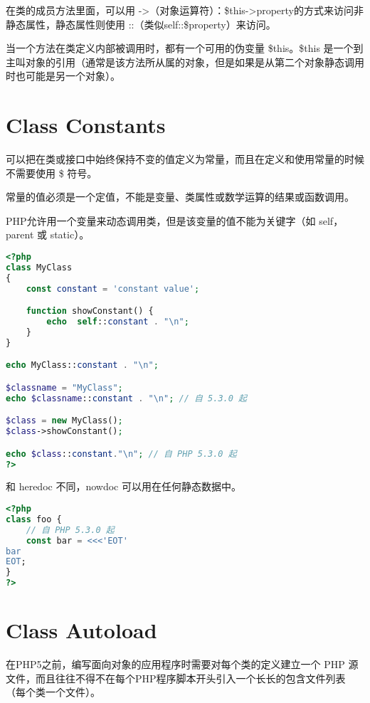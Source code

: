 在类的成员方法里面，可以用 ->（对象运算符）：\$this->property的方式来访问非静态属性，静态属性则使用 ::（类似self::\$property）来访问。



当一个方法在类定义内部被调用时，都有一个可用的伪变量 \$this。\$this 是一个到主叫对象的引用（通常是该方法所从属的对象，但是如果是从第二个对象静态调用时也可能是另一个对象）。





\chapter{Class Constants}


可以把在类或接口中始终保持不变的值定义为常量，而且在定义和使用常量的时候不需要使用 \$ 符号。

常量的值必须是一个定值，不能是变量、类属性或数学运算的结果或函数调用。

PHP允许用一个变量来动态调用类，但是该变量的值不能为关键字（如 self，parent 或 static）。





\begin{lstlisting}[language=PHP]
<?php
class MyClass
{
    const constant = 'constant value';

    function showConstant() {
        echo  self::constant . "\n";
    }
}

echo MyClass::constant . "\n";

$classname = "MyClass";
echo $classname::constant . "\n"; // 自 5.3.0 起

$class = new MyClass();
$class->showConstant();

echo $class::constant."\n"; // 自 PHP 5.3.0 起
?>
\end{lstlisting}

和 heredoc 不同，nowdoc 可以用在任何静态数据中。





\begin{lstlisting}[language=PHP]
<?php
class foo {
    // 自 PHP 5.3.0 起
    const bar = <<<'EOT'
bar
EOT;
}
?>
\end{lstlisting}


\chapter{Class Autoload}

在PHP5之前，编写面向对象的应用程序时需要对每个类的定义建立一个 PHP 源文件，而且往往不得不在每个PHP程序脚本开头引入一个长长的包含文件列表（每个类一个文件）。

